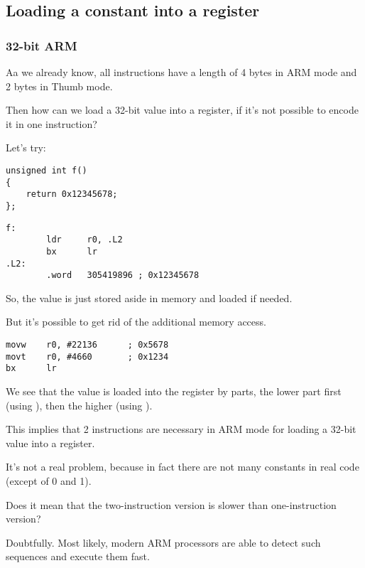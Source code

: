 ﻿\subsection{Loading a constant into a register}
\label{ARM_big_constants}

\subsubsection{32-bit ARM}
\label{ARM_big_constants_loading}

Aa we already know, all instructions have a length of 4 bytes in ARM mode and 2 bytes in Thumb mode.

Then how can we load a 32-bit value into a register, if it's not possible to encode it in one instruction?

Let's try:

\begin{lstlisting}
unsigned int f()
{
	return 0x12345678;
};
\end{lstlisting}

\begin{lstlisting}[caption=GCC 4.6.3 -O3 \ARMMode]
f:
        ldr     r0, .L2
        bx      lr
.L2:
        .word   305419896 ; 0x12345678
\end{lstlisting}

So, the  value is just stored aside in memory and loaded if needed.

But it's possible to get rid of the additional memory access.

\begin{lstlisting}[caption=GCC 4.6.3 -O3 -march{=}armv7-a (\ARMMode)]
movw    r0, #22136      ; 0x5678
movt    r0, #4660       ; 0x1234
bx      lr
\end{lstlisting}

We see that the value is loaded into the register by parts, the lower part first (using ), 
then the higher (using ).

This implies that 2 instructions are necessary in ARM mode for loading a 32-bit value into a register.

It's not a real problem, because in fact there are not many constants in real code (except of 0 and 1).

Does it mean that the two-instruction version is slower than one-instruction version?

Doubtfully. Most likely, modern ARM processors are able to detect such sequences and execute
them fast.

